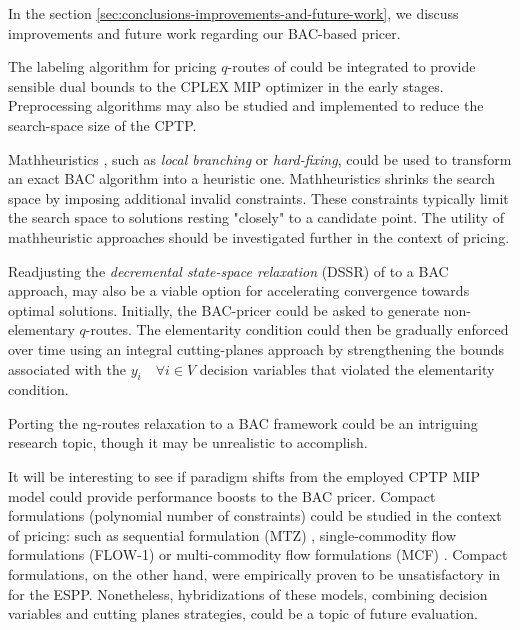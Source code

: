 In the section \cref{sec:conclusions-improvements-and-future-work}, we discuss improvements and future work regarding our BAC-based pricer.

The labeling algorithm for pricing $q$-routes of \textcite{desrochers1992} could be integrated to provide sensible dual bounds to the CPLEX MIP optimizer in the early stages.
Preprocessing algorithms may also be studied and implemented to reduce the search-space size of the CPTP.

Mathheuristics \parencite{fischetti2018}, such as \textit{local branching} \parencite{fischetti2003} or \textit{hard-fixing}, could be used to transform an exact BAC algorithm into a heuristic one.
Mathheuristics shrinks the search space by imposing additional invalid constraints.
These constraints typically limit the search space to solutions resting "closely" to a candidate point.
The utility of mathheuristic approaches should be investigated further in the context of pricing.

Readjusting the \textit{decremental state-space relaxation} (DSSR) of \textcite{boland2006, righini2008, martinelli2014} to a BAC approach, may also be a viable option for accelerating convergence towards optimal solutions.
Initially, the BAC-pricer could be asked to generate non-elementary $q$-routes.
The elementarity condition could then be gradually enforced over time using an integral cutting-planes approach by strengthening the bounds associated with the $y_i \quad \forall i \in V$ decision variables that violated the elementarity condition.

Porting the ng-routes relaxation \parencite{baldacci2011} to a BAC framework could be an intriguing research topic, though it may be unrealistic to accomplish.

It will be interesting to see if paradigm shifts from the employed CPTP MIP model could provide performance boosts to the BAC pricer. Compact formulations (polynomial number of constraints) could be studied in the context of pricing: such as sequential formulation (MTZ) \parencite{miller1960}, single-commodity flow formulations (FLOW-1) \parencite{gavish1978travelling} or multi-commodity flow formulations (MCF) \parencite{wong1980integer,claus1984new}.
Compact formulations, on the other hand, were empirically proven to be unsatisfactory in \textcite{taccari2016} for the ESPP. Nonetheless, hybridizations of these models, combining decision variables and cutting planes strategies, could be a topic of future evaluation.


